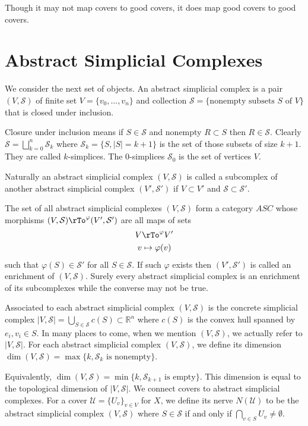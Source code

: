 \documentclass[12pt]{amsart}
\theoremstyle{definition}
\begin{document}
Though it may not map covers to good covers, it does map good covers to good covers.

\section{Abstract Simplicial Complexes}\label{abstractsimplicialcomplexes} We consider the next set of objects.
\dfn An abstract simplicial complex is a pair $(V, \mathcal{S})$ of finite set $V = \{v_0, \dots , v_n\}$ and collection $\mathcal{S} = \{\text{nonempty subsets } S \text{ of } V\}$ that is closed under inclusion.

Closure under inclusion means if $S \in \mathcal{S}$ and nonempty $R \subset S$ then $R \in \mathcal{S}$. Clearly $\mathcal{S} = \bigsqcup\limits_{k = 0}^n \mathcal{S}_k$ where $\mathcal{S}_k = \{S, |S| = k + 1\}$ is the set of those subsets of size $k+1$. They are called $k$-simplices. The $0$-simplices $\mathcal{S}_0 $ is the set of vertices $V$.

Naturally an abstract simplicial complex $(V, \mathcal{S})$ is called a subcomplex of another abstract simplicial complex $(V', \mathcal{S}')$ if $V \subset V'$ and $\mathcal{S} \subset \mathcal{S}'$.

The set of all abstract simplicial complexes $(V, \mathcal{S})$ form a category $ASC$ whose morphisms $(V, \mathcal{S}) \rTo^{\varphi} (V', \mathcal{S}')$ are all maps of sets
\begin{align*}
V & \rTo^{\varphi} V' \\
v & \mapsto \varphi(v)
\end{align*}
such that $\varphi(S) \in \mathcal{S}'$ for all $S \in \mathcal{S}$. If such $\varphi$ exists then $(V', \mathcal{S}')$ is called an enrichment of $(V, \mathcal{S})$. Surely every abstract simplicial complex is an enrichment of its subcomplexes while the converse may not be true.

Associated to each abstract simplicial complex $(V, \mathcal{S})$ is the concrete simplicial complex $|V, \mathcal{S}| = \bigcup \limits_{S \in \mathcal{S}} c(S) \subset \mathbb{R}^n$ where $c(S)$ is the convex hull spanned by $e_i, v_i \in S$. In many places to come, when we mention $(V, \mathcal{S})$, we actually refer to $|V, \mathcal{S}|$.
\dfn For each abstract simplicial complex $(V, \mathcal{S})$, we define its dimension $\dim(V, \mathcal{S}) = \max \{k, \mathcal{S}_k \text{ is nonempty}\}$.

Equivalently, $\dim(V, \mathcal{S}) = \min \{k, \mathcal{S}_{k+1} \text{ is empty}\}$. This dimension is equal to the topological dimension of $|V, \mathcal{S}|$. We connect covers to abstract simplicial complexes.
\dfn For a cover $\mathcal{U} = \{U_v\}_{v \in V}$ for $X$, we define its nerve $N(\mathcal{U})$ to be the abstract simplicial complex $(V, \mathcal{S})$ where $S \in \mathcal{S}$ if and only if $\bigcap\limits_{v \in S} U_v \neq \emptyset$.
\end{document}
